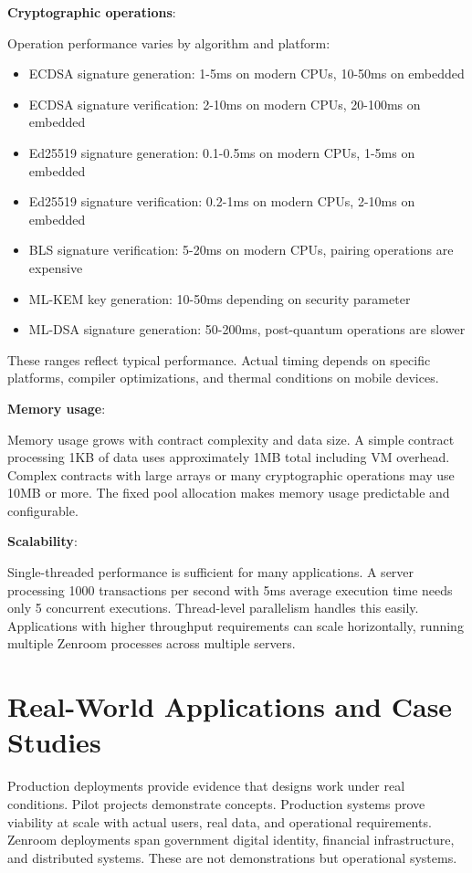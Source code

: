 \textbf{Cryptographic operations}:

Operation performance varies by algorithm and platform:

\begin{itemize}
\item ECDSA signature generation: 1-5ms on modern CPUs, 10-50ms on
  embedded
\item ECDSA signature verification: 2-10ms on modern CPUs, 20-100ms on
  embedded
\item Ed25519 signature generation: 0.1-0.5ms on modern CPUs, 1-5ms on
  embedded
\item Ed25519 signature verification: 0.2-1ms on modern CPUs, 2-10ms
  on embedded
\item BLS signature verification: 5-20ms on modern CPUs, pairing
  operations are expensive
\item ML-KEM key generation: 10-50ms depending on security parameter
\item ML-DSA signature generation: 50-200ms, post-quantum operations
  are slower
\end{itemize}

These ranges reflect typical performance. Actual timing depends on
specific platforms, compiler optimizations, and thermal conditions on
mobile devices.

\textbf{Memory usage}:

Memory usage grows with contract complexity and data size. A simple
contract processing 1KB of data uses approximately 1MB total including
VM overhead. Complex contracts with large arrays or many cryptographic
operations may use 10MB or more. The fixed pool allocation makes
memory usage predictable and configurable.

\textbf{Scalability}:

Single-threaded performance is sufficient for many applications. A
server processing 1000 transactions per second with 5ms average
execution time needs only 5 concurrent executions. Thread-level
parallelism handles this easily. Applications with higher throughput
requirements can scale horizontally, running multiple Zenroom
processes across multiple servers.

\section{Real-World Applications and Case Studies}

Production deployments provide evidence that designs work under real
conditions. Pilot projects demonstrate concepts. Production systems
prove viability at scale with actual users, real data, and operational
requirements. Zenroom deployments span government digital identity,
financial infrastructure, and distributed systems. These are not
demonstrations but operational systems.

